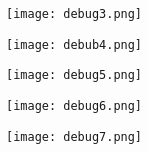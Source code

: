 \documentclass[11pt, a4paper]{article}
\begin{document}
\begin{center}
    \texttt{[image: debug3.png]}
\end{center}
\newpage
\vspace{0.8cm}
\begin{center}
    \texttt{[image: debub4.png]}
\end{center}
\newpage
\vspace{0.8cm}

\begin{center}
    \texttt{[image: debug5.png]}
\end{center}
\newpage
\vspace{0.8cm}

\begin{center}
    \texttt{[image: debug6.png]}
\end{center}
\begin{center}
    \texttt{[image: debug7.png]}
\end{center}
\end{document}
